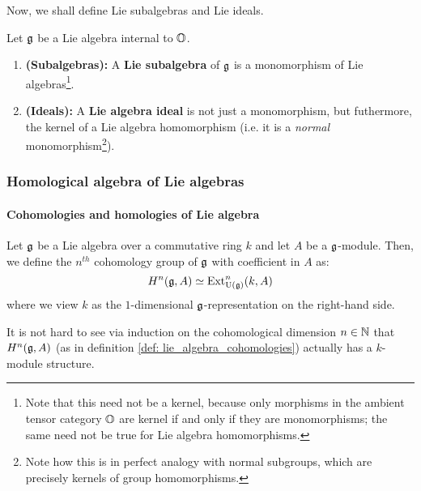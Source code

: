                     Now, we shall define Lie subalgebras and Lie ideals. 
                    \begin{definition} \label{def: lie_subalgebras_and_lie_ideals}
                        Let $\mathfrak{g}$ be a Lie algebra internal to $\mathbb{O}$. 
                            \begin{enumerate}
                                \item \textbf{(Subalgebras):} A \textbf{Lie subalgebra} of $\mathfrak{g}$ is a monomorphism of Lie algebras\footnote{Note that this need not be a kernel, because only  morphisms in the ambient tensor category $\mathbb{O}$ are kernel if and only if they are monomorphisms; the same need not be true for Lie algebra homomorphisms.}.
                                \item \textbf{(Ideals):} A \textbf{Lie algebra ideal} is not just a monomorphism, but futhermore, the kernel of a Lie algebra homomorphism (i.e. it is a \textit{normal} monomorphism\footnote{Note how this is in perfect analogy with normal subgroups, which are precisely kernels of group homomorphisms.}). 
                            \end{enumerate}
                    \end{definition}
                    
            \subsubsection{Homological algebra of Lie algebras}
                \paragraph{Cohomologies and homologies of Lie algebra}
                    \begin{definition} \label{def: lie_algebra_cohomologies}
                        Let $\mathfrak{g}$ be a Lie algebra over a commutative ring $k$ and let $A$ be a $\mathfrak{g}$-module. Then, we define the $n^{th}$ cohomology group of $\mathfrak{g}$ with coefficient in $A$ as:
                            $$H^n(\mathfrak{g}, A) \simeq \mathrm{Ext}^n_{\mathrm{U}(\mathfrak{g})}(k, A)$$
                        where we view $k$ as the $1$-dimensional $\mathfrak{g}$-representation on the right-hand side. 
                    \end{definition}
                    \begin{remark}
                        It is not hard to see via induction on the cohomological dimension $n \in \mathbb{N}$ that $H^n(\mathfrak{g}, A)$ (as in definition \ref{def: lie_algebra_cohomologies}) actually has a $k$-module structure.
                    \end{remark}
                    
